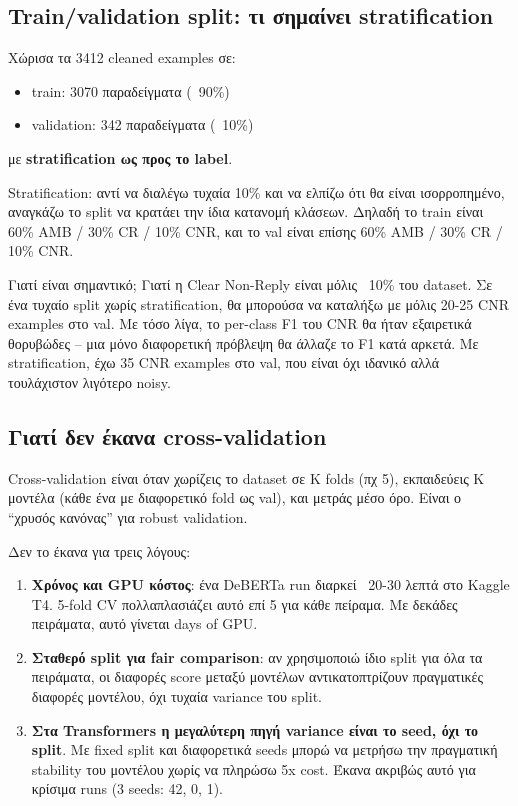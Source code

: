 \documentclass[12pt]{fphw}
\begin{document}
\subsection{Train/validation split: τι σημαίνει stratification}

Χώρισα τα 3412 cleaned examples σε:

\begin{itemize}
    \item train: 3070 παραδείγματα (~90\%)
    \item validation: 342 παραδείγματα (~10\%)
\end{itemize}

με \textbf{stratification ως προς το label}.

Stratification: αντί να διαλέγω τυχαία 10\% και να ελπίζω ότι θα είναι ισορροπημένο, αναγκάζω το split να κρατάει την ίδια κατανομή κλάσεων. Δηλαδή το train είναι 60\% AMB / 30\% CR / 10\% CNR, και το val είναι επίσης 60\% AMB / 30\% CR / 10\% CNR.

Γιατί είναι σημαντικό; Γιατί η Clear Non-Reply είναι μόλις ~10\% του dataset. Σε ένα τυχαίο split χωρίς stratification, θα μπορούσα να καταλήξω με μόλις 20-25 CNR examples στο val. Με τόσο λίγα, το per-class F1 του CNR θα ήταν εξαιρετικά θορυβώδες -- μια μόνο διαφορετική πρόβλεψη θα άλλαζε το F1 κατά αρκετά. Με stratification, έχω 35 CNR examples στο val, που είναι όχι ιδανικό αλλά τουλάχιστον λιγότερο noisy.

\subsection{Γιατί δεν έκανα cross-validation}

Cross-validation είναι όταν χωρίζεις το dataset σε K folds (πχ 5), εκπαιδεύεις K μοντέλα (κάθε ένα με διαφορετικό fold ως val), και μετράς μέσο όρο. Είναι ο ``χρυσός κανόνας'' για robust validation.

Δεν το έκανα για τρεις λόγους:

\begin{enumerate}
    \item \textbf{Χρόνος και GPU κόστος}: ένα DeBERTa run διαρκεί ~20-30 λεπτά στο Kaggle T4. 5-fold CV πολλαπλασιάζει αυτό επί 5 για κάθε πείραμα. Με δεκάδες πειράματα, αυτό γίνεται days of GPU.
    \item \textbf{Σταθερό split για fair comparison}: αν χρησιμοποιώ ίδιο split για όλα τα πειράματα, οι διαφορές score μεταξύ μοντέλων αντικατοπτρίζουν πραγματικές διαφορές μοντέλου, όχι τυχαία variance του split.
    \item \textbf{Στα Transformers η μεγαλύτερη πηγή variance είναι το seed, όχι το split}. Με fixed split και διαφορετικά seeds μπορώ να μετρήσω την πραγματική stability του μοντέλου χωρίς να πληρώσω 5x cost. Έκανα ακριβώς αυτό για κρίσιμα runs (3 seeds: 42, 0, 1).
\end{enumerate}
\end{document}
